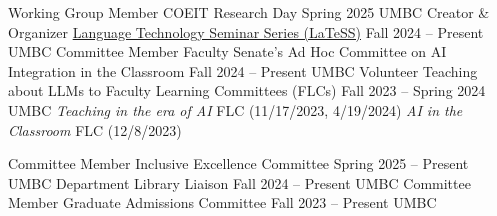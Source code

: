 {\color{black}\fontsize{12pt}{1em}} 

\begin{cventries}
\cventry
    {Working Group Member}
    {COEIT Research Day}
    {Spring 2025}
    {UMBC}
    {}
\cventry
    {Creator \& Organizer}
    {\href{https://laramartin.net/LaTeSS.html}{Language Technology Seminar Series (LaTeSS)}}
    {Fall 2024 -- Present}
    {UMBC}
    {}
\cventry
    {Committee Member}
    {Faculty Senate's Ad Hoc Committee on AI Integration in the Classroom}
    {Fall 2024 -- Present}
    {UMBC}
    {}  
\cventry
    {Volunteer}
    {Teaching about LLMs to Faculty Learning Committees (FLCs)}
    {Fall 2023 -- Spring 2024}
    {UMBC}
    {\textit{Teaching in the era of AI} FLC (11/17/2023, 4/19/2024)\newline
    \textit{AI in the Classroom} FLC (12/8/2023)}   
\end{cventries}


{\color{black}\fontsize{12pt}{1em}} 

\begin{cventries}
\cventry
    {Committee Member}
    {Inclusive Excellence Committee}
    {Spring 2025 -- Present}
    {UMBC}
    {}
\cventry
    {}
    {Department Library Liaison}
    {Fall 2024 -- Present}
    {UMBC}
    {}  
\cventry
    {Committee Member}
    {Graduate Admissions Committee}
    {Fall 2023 -- Present}
    {UMBC}
    {}    
\end{cventries}
